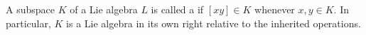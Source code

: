 A subspace $K$ of a Lie algebra $L$ is called a  if $[xy] \in K$ whenever $x, y \in K$. In particular, $K$ is a Lie algebra in its own right relative to the inherited operations.
